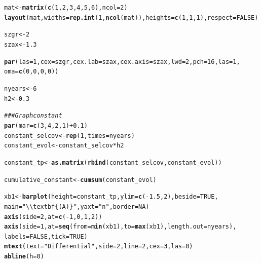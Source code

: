\documentclass{article}\usepackage[]{graphicx}\usepackage[]{color}
\makeatletter
\newcommand{\hlnum}[1]{\textcolor[rgb]{0.686,0.059,0.569}{#1}}%
\newcommand{\hlstr}[1]{\textcolor[rgb]{0.192,0.494,0.8}{#1}}%
\newcommand{\hlcom}[1]{\textcolor[rgb]{0.678,0.584,0.686}{\textit{#1}}}%
\newcommand{\hlopt}[1]{\textcolor[rgb]{0,0,0}{#1}}%
\newcommand{\hlstd}[1]{\textcolor[rgb]{0.345,0.345,0.345}{#1}}%
\newcommand{\hlkwb}[1]{\textcolor[rgb]{0.69,0.353,0.396}{#1}}%
\newcommand{\hlkwc}[1]{\textcolor[rgb]{0.333,0.667,0.333}{#1}}%
\newcommand{\hlkwd}[1]{\textcolor[rgb]{0.737,0.353,0.396}{\textbf{#1}}}%
\newenvironment{kframe}{%
 \def\at@end@of@kframe{}%
 \ifinner\ifhmode%
  \def\at@end@of@kframe{\end{minipage}}%
  \begin{minipage}{\columnwidth}%
 \fi\fi%
 \def\FrameCommand##1{\hskip\@totalleftmargin \hskip-\fboxsep
 \colorbox{shadecolor}{##1}\hskip-\fboxsep
     \hskip-\linewidth \hskip-\@totalleftmargin \hskip\columnwidth}%
 \MakeFramed {\advance\hsize-\width
   \@totalleftmargin\z@ \linewidth\hsize
   \@setminipage}}%
 {\par\unskip\endMakeFramed%
 \at@end@of@kframe}
\newenvironment{knitrout}{}{} %
\makeatother
\begin{document}
\begin{knitrout}
\color{fgcolor}\begin{kframe}
\begin{alltt}
\hlstd{mat} \hlkwb{<-} \hlkwd{matrix}\hlstd{(}\hlkwd{c}\hlstd{(}\hlnum{1}\hlstd{,} \hlnum{2}\hlstd{,} \hlnum{3}\hlstd{,} \hlnum{4}\hlstd{,} \hlnum{5}\hlstd{,} \hlnum{6}\hlstd{),}\hlkwc{ncol} \hlstd{=} \hlnum{2}\hlstd{)}
\hlkwd{layout}\hlstd{(mat,} \hlkwc{widths} \hlstd{=} \hlkwd{rep.int}\hlstd{(}\hlnum{1}\hlstd{,} \hlkwd{ncol}\hlstd{(mat)),} \hlkwc{heights} \hlstd{=} \hlkwd{c}\hlstd{(}\hlnum{1}\hlstd{,}\hlnum{1}\hlstd{,}\hlnum{1}\hlstd{),} \hlkwc{respect} \hlstd{=} \hlnum{FALSE} \hlstd{)}

\hlstd{szgr} \hlkwb{<-} \hlnum{2}
\hlstd{szax} \hlkwb{<-} \hlnum{1.3}

\hlkwd{par}\hlstd{(}\hlkwc{las}\hlstd{=}\hlnum{1}\hlstd{,} \hlkwc{cex}\hlstd{=szgr,} \hlkwc{cex.lab}\hlstd{=szax ,} \hlkwc{cex.axis}\hlstd{=szax,} \hlkwc{lwd}\hlstd{=}\hlnum{2} \hlstd{,}\hlkwc{pch}\hlstd{=}\hlnum{16}\hlstd{,} \hlkwc{las}\hlstd{=}\hlnum{1}\hlstd{,}
    \hlkwc{oma}\hlstd{=}\hlkwd{c}\hlstd{(}\hlnum{0}\hlstd{,}\hlnum{0}\hlstd{,}\hlnum{0}\hlstd{,}\hlnum{0}\hlstd{))}

\hlstd{nyears} \hlkwb{<-} \hlnum{6}
\hlstd{h2} \hlkwb{<-} \hlnum{0.3}

\hlcom{### Graph constant}
\hlkwd{par}\hlstd{(}\hlkwc{mar}\hlstd{=}\hlkwd{c}\hlstd{(}\hlnum{3}\hlstd{,} \hlnum{4}\hlstd{,} \hlnum{2}\hlstd{,} \hlnum{1}\hlstd{)} \hlopt{+} \hlnum{0.1}\hlstd{)}
\hlstd{constant_selcov} \hlkwb{<-} \hlkwd{rep}\hlstd{(}\hlnum{1}\hlstd{,} \hlkwc{times}\hlstd{=nyears)}
\hlstd{constant_evol} \hlkwb{<-} \hlstd{constant_selcov} \hlopt{*} \hlstd{h2}

\hlstd{constant_tp} \hlkwb{<-} \hlkwd{as.matrix}\hlstd{(}\hlkwd{rbind}\hlstd{(constant_selcov, constant_evol))}

\hlstd{cumulative_constant} \hlkwb{<-} \hlkwd{cumsum}\hlstd{(constant_evol)}

\hlstd{xb1} \hlkwb{<-} \hlkwd{barplot}\hlstd{(}\hlkwc{height} \hlstd{= constant_tp,} \hlkwc{ylim} \hlstd{=} \hlkwd{c}\hlstd{(}\hlopt{-}\hlnum{1.5}\hlstd{,}\hlnum{2}\hlstd{),} \hlkwc{beside} \hlstd{=} \hlnum{TRUE}\hlstd{,}
               \hlkwc{main}\hlstd{=}\hlstr{"\textbackslash{}\textbackslash{}textbf\{(A)\}"}\hlstd{,} \hlkwc{yaxt}\hlstd{=}\hlstr{"n"}\hlstd{,} \hlkwc{border} \hlstd{=} \hlnum{NA}\hlstd{)}
\hlkwd{axis}\hlstd{(}\hlkwc{side}\hlstd{=}\hlnum{2}\hlstd{,} \hlkwc{at} \hlstd{=} \hlkwd{c}\hlstd{(}\hlopt{-}\hlnum{1}\hlstd{,}\hlnum{0}\hlstd{,}\hlnum{1}\hlstd{,}\hlnum{2}\hlstd{))}
\hlkwd{axis}\hlstd{(}\hlkwc{side}\hlstd{=}\hlnum{1}\hlstd{,} \hlkwc{at} \hlstd{=} \hlkwd{seq}\hlstd{(}\hlkwc{from}\hlstd{=}\hlkwd{min}\hlstd{(xb1),} \hlkwc{to}\hlstd{=}\hlkwd{max}\hlstd{(xb1),} \hlkwc{length.out} \hlstd{= nyears),}
     \hlkwc{labels} \hlstd{=} \hlnum{FALSE}\hlstd{,}\hlkwc{tick} \hlstd{=} \hlnum{TRUE}\hlstd{)}
\hlkwd{mtext}\hlstd{(}\hlkwc{text} \hlstd{=} \hlstr{"Differential"}\hlstd{,} \hlkwc{side} \hlstd{=} \hlnum{2}\hlstd{,} \hlkwc{line} \hlstd{=} \hlnum{2}\hlstd{,} \hlkwc{cex}\hlstd{=}\hlnum{3}\hlstd{,} \hlkwc{las}\hlstd{=}\hlnum{0}\hlstd{)}
\hlkwd{abline}\hlstd{(}\hlkwc{h}\hlstd{=}\hlnum{0}\hlstd{)}


\end{alltt}
\end{kframe}
\end{knitrout}
\end{document}
